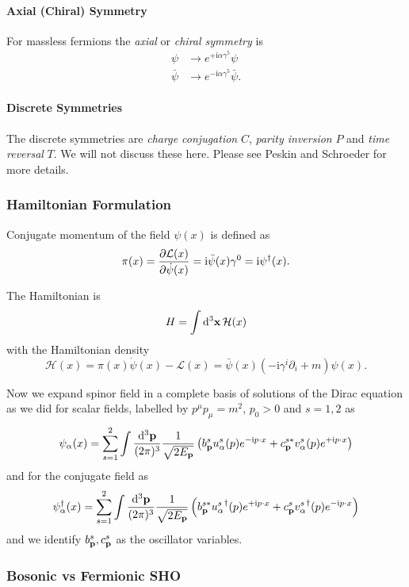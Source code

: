 \documentclass[a4paper,11pt]{article}
\begin{document}
	\paragraph{Axial (Chiral) Symmetry} For massless fermions the \emph{axial} or \emph{chiral symmetry} is
	\begin{align*}
		\psi &\to e ^{+\mathrm{i} \alpha \gamma^5} \psi\\
		\bar \psi &\to e ^{-\mathrm{i} \alpha \gamma^5} \bar \psi.
	\end{align*}

	\paragraph{Discrete Symmetries} The discrete symmetries are \emph{charge conjugation} $C$, \emph{parity inversion} $P$ and \emph{time reversal} $T$. We will not discuss these here. Please see Peskin and Schroeder for more details.

	\subsubsection{Hamiltonian Formulation}
	Conjugate momentum of the field $\psi(x)$ is defined as 
	\[
		\pi(x) = \pdv{\mathcal{L}(x)}{\dot \psi(x)} = \mathrm{i} \bar \psi(x) \gamma^0 = \mathrm{i} \psi^{\dagger}(x).
	\]

	The Hamiltonian is 
	\[
		H = \int \dd[3]{\vb x} \mathcal{H}(x)
	\]
	with the Hamiltonian density
	\[
		\mathcal{H}(x) = \pi(x) \dot \psi(x) - \mathcal{L}(x) = \bar \psi(x)\left( - \mathrm{i} \gamma^i \partial_i + m \right) \psi(x).
	\]
	
	Now we expand spinor field in a complete basis of solutions of the Dirac equation as we did for scalar fields, labelled by $p^\mu p_\mu = m^2$, $p_0 > 0$ and $s = 1,2$ as 
	\[
		\psi_\alpha(x) = \sum _{s = 1}^2 \int \frac{\dd[3]{\vb p}}{(2\pi)^{3}} \frac{1}{\sqrt{2 E _{\vb p}}} \left( b^s _{\vb p} u^s_\alpha(p) e ^{- \mathrm{i}p \cdot x} + c ^{s*}_{\vb p} v^s_\alpha (p) e ^{+ \mathrm{i} p \cdot x} \right)
	\]
	and for the conjugate field as 
	\[
		\psi^{\dagger}_\alpha(x) = \sum _{s = 1}^2 \int \frac{\dd[3]{\vb p}}{(2\pi)^{3}} \frac{1}{\sqrt{2 E _{\vb p}}} \left( b^{s*} _{\vb p} {u^s_\alpha}^{\dagger}(p) e ^{+ \mathrm{i}p \cdot x} + c ^{s}_{\vb p} {v^s_\alpha}^{\dagger} (p) e ^{- \mathrm{i} p \cdot x} \right)
	\]
	and we identify $b^s _{\vb p}, c^s _{\vb p}$ as the oscillator variables.
	
	\subsubsection{Bosonic vs Fermionic SHO}
\end{document}
